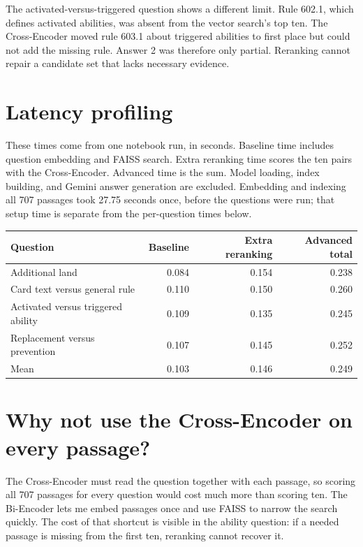 \documentclass[11pt,a4paper]{article}
\begin{document}
The activated-versus-triggered question shows a different limit. Rule 602.1, which defines activated abilities, was absent from the vector search's top ten. The Cross-Encoder moved rule 603.1 about triggered abilities to first place but could not add the missing rule. Answer 2 was therefore only partial. Reranking cannot repair a candidate set that lacks necessary evidence.

\section*{Latency profiling}
These times come from one notebook run, in seconds. Baseline time includes question embedding and FAISS search. Extra reranking time scores the ten pairs with the Cross-Encoder. Advanced time is the sum. Model loading, index building, and Gemini answer generation are excluded. Embedding and indexing all 707 passages took 27.75 seconds once, before the questions were run; that setup time is separate from the per-question times below.

\begin{center}
\begin{tabular}{@{}lrrr@{}}
\toprule
Question & Baseline & Extra reranking & Advanced total \\
\midrule
Additional land & 0.084 & 0.154 & 0.238 \\
Card text versus general rule & 0.110 & 0.150 & 0.260 \\
Activated versus triggered ability & 0.109 & 0.135 & 0.245 \\
Replacement versus prevention & 0.107 & 0.145 & 0.252 \\
\midrule
Mean & 0.103 & 0.146 & 0.249 \\
\bottomrule
\end{tabular}
\end{center}

\section*{Why not use the Cross-Encoder on every passage?}
The Cross-Encoder must read the question together with each passage, so scoring all 707 passages for every question would cost much more than scoring ten. The Bi-Encoder lets me embed passages once and use FAISS to narrow the search quickly. The cost of that shortcut is visible in the ability question: if a needed passage is missing from the first ten, reranking cannot recover it.
\end{document}
